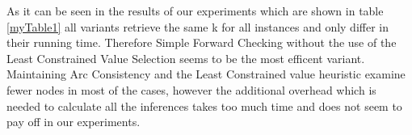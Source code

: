 \documentclass[a4paper]{scrartcl}
\begin{document}
As it can be seen in the results of our experiments which are shown in table \ref{myTable1} all variants retrieve the same k for all instances and only differ in their running time. Therefore Simple Forward Checking without the use of the Least Constrained Value Selection seems to be the most efficent variant. Maintaining Arc Consistency and the Least Constrained value heuristic examine fewer nodes in most of the cases, however the additional overhead which is needed to calculate all the inferences takes too much time and does not seem to pay off in our experiments.






\end{document}
